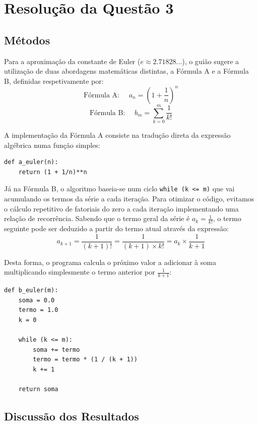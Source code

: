 \documentclass{article}
\begin{document}
\section{Resolução da Questão 3}

\subsection{Métodos}
Para a aproximação da constante de Euler ($e \approx 2.71828...$), o guião sugere a utilização de duas abordagens matemáticas distintas, a Fórmula A e a Fórmula B, definidas respetivamente por:
\[ \text{Fórmula A: } \quad a_n = \left(1 + \frac{1}{n}\right)^n \]
\[ \text{Fórmula B: } \quad b_m = \sum_{k=0}^{m} \frac{1}{k!} \]

A implementação da Fórmula A consiste na tradução direta da expressão algébrica numa função simples:

\begin{verbatim}
def a_euler(n):
    return (1 + 1/n)**n
\end{verbatim}

Já na Fórmula B, o algoritmo baseia-se num ciclo \texttt{while (k <= m)} que vai acumulando os termos da série a cada iteração. Para otimizar o código, evitamos o cálculo repetitivo de fatoriais do zero a cada iteração implementando uma relação de recorrência. Sabendo que o termo geral da série é $a_k = \frac{1}{k!}$, o termo seguinte pode ser deduzido a partir do termo atual através da expressão:
\[ a_{k+1} = \frac{1}{(k+1)!} = \frac{1}{(k+1) \times k!} = a_k \times \frac{1}{k+1} \]

Desta forma, o programa calcula o próximo valor a adicionar à soma multiplicando simplesmente o termo anterior por $\frac{1}{k+1}$:

\begin{verbatim}
def b_euler(m):
    soma = 0.0
    termo = 1.0
    k = 0

    while (k <= m):
        soma += termo
        termo = termo * (1 / (k + 1))
        k += 1

    return soma
\end{verbatim}

\subsection{Discussão dos Resultados}
\end{document}
